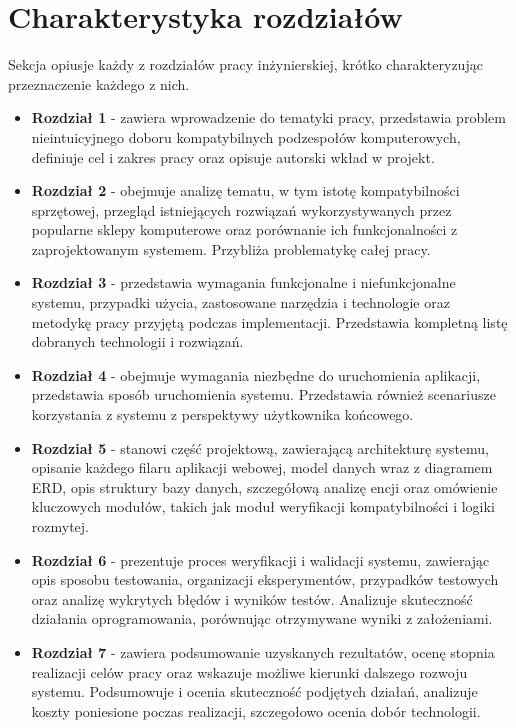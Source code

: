 \documentclass[a4paper,twoside,12pt]{book}
\begin{document}
\section{Charakterystyka rozdziałów}
Sekcja opiusje każdy z rozdziałów pracy inżynierskiej, krótko charakteryzując przeznaczenie każdego z nich.
\begin{itemize}
    \item \textbf{Rozdział 1} - zawiera wprowadzenie do tematyki pracy, przedstawia problem nieintuicyjnego doboru kompatybilnych podzespołów komputerowych, definiuje cel i zakres pracy oraz opisuje autorski wkład w projekt.

    \item \textbf{Rozdział 2} - obejmuje analizę tematu, w tym istotę kompatybilności sprzętowej, przegląd istniejących rozwiązań wykorzystywanych przez popularne sklepy komputerowe oraz porównanie ich funkcjonalności z zaprojektowanym systemem. Przybliża problematykę całej pracy.

    \item \textbf{Rozdział 3} - przedstawia wymagania funkcjonalne i niefunkcjonalne systemu, przypadki użycia, zastosowane narzędzia i technologie oraz metodykę pracy przyjętą podczas implementacji. Przedstawia kompletną listę dobranych technologii i rozwiązań.
    \item \textbf{Rozdział 4} - obejmuje wymagania niezbędne do uruchomienia aplikacji, przedstawia sposób uruchomienia systemu. Przedstawia również scenariusze korzystania z systemu z perspektywy użytkownika końcowego.
    \item \textbf{Rozdział 5} - stanowi część projektową, zawierającą architekturę systemu, opisanie każdego filaru aplikacji webowej, model danych wraz z diagramem ERD, opis struktury bazy danych, szczegółową analizę encji oraz omówienie kluczowych modułów, takich jak moduł weryfikacji kompatybilności i logiki rozmytej.

    \item \textbf{Rozdział 6} - prezentuje proces weryfikacji i walidacji systemu, zawierając opis sposobu testowania, organizacji eksperymentów, przypadków testowych oraz analizę wykrytych błędów i wyników testów. Analizuje skuteczność działania oprogramowania, porównując otrzymywane wyniki z założeniami.

    \item \textbf{Rozdział 7} - zawiera podsumowanie uzyskanych rezultatów, ocenę stopnia realizacji celów pracy oraz wskazuje możliwe kierunki dalszego rozwoju systemu. Podsumowuje i ocenia skuteczność podjętych działań, analizuje koszty poniesione poczas realizacji, szczegołowo ocenia dobór technologii.
\end{itemize}
\end{document}

